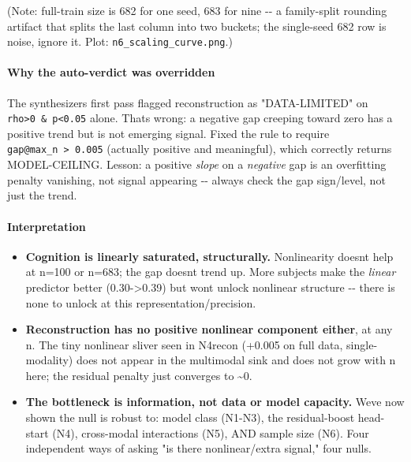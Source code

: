 (Note: full-train size is 682 for one seed, 683 for nine -\/- a family-split rounding artifact that splits the last column into two buckets; the single-seed 682 row is noise, ignore it. Plot: \texttt{n6\_scaling\_curve.png}.)

\paragraph{Why the auto-verdict was overridden}\label{why-the-auto-verdict-was-overridden}

The synthesizer\textquotesingle s first pass flagged reconstruction as "DATA-LIMITED" on \texttt{rho\textgreater{}0\ \&\ p\textless{}0.05} alone. That\textquotesingle s wrong: a negative gap creeping toward zero has a positive trend but is not emerging signal. Fixed the rule to require \texttt{gap@max\_n\ \textgreater{}\ 0.005} (actually positive and meaningful), which correctly returns MODEL-CEILING. Lesson: a positive \emph{slope} on a \emph{negative} gap is an overfitting penalty vanishing, not signal appearing -\/- always check the gap sign/level, not just the trend.

\paragraph{Interpretation}\label{interpretation}

\begin{itemize}
\tightlist
\item
  \textbf{Cognition is linearly saturated, structurally.} Nonlinearity doesn\textquotesingle t help at n=100 or n=683; the gap doesn\textquotesingle t trend up. More subjects make the \emph{linear} predictor better (0.30-\textgreater0.39) but won\textquotesingle t unlock nonlinear structure -\/- there is none to unlock at this representation/precision.
\item
  \textbf{Reconstruction has no positive nonlinear component either}, at any n. The tiny nonlinear sliver seen in N4recon (+0.005 on full data, single-modality) does not appear in the multimodal sink and does not grow with n here; the residual penalty just converges to \textasciitilde0.
\item
  \textbf{The bottleneck is information, not data or model capacity.} We\textquotesingle ve now shown the null is robust to: model class (N1-N3), the residual-boost head-start (N4), cross-modal interactions (N5), AND sample size (N6). Four independent ways of asking "is there nonlinear/extra signal," four nulls.
\end{itemize}

